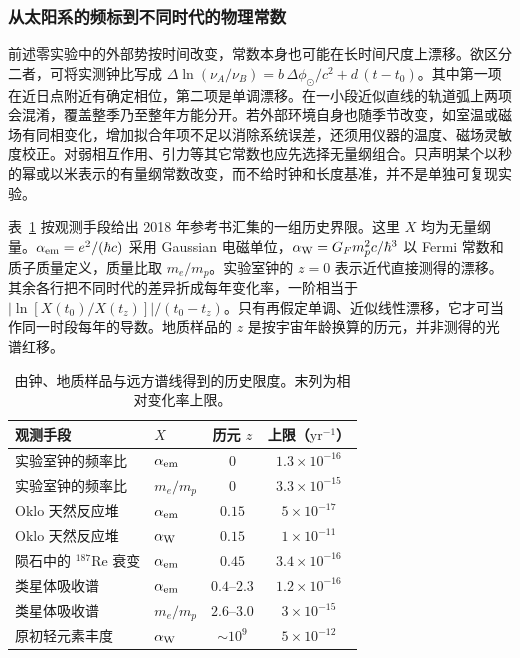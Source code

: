 \subsubsection{从太阳系的频标到不同时代的物理常数}

前述零实验中的外部势按时间改变，常数本身也可能在长时间尺度上漂移。欲区分二者，可将实测钟比写成 $\Delta\ln(\nu_A/\nu_B)=b\,\Delta\phi_\odot/c^2+d\,(t-t_0)$。其中第一项在近日点附近有确定相位，第二项是单调漂移。在一小段近似直线的轨道弧上两项会混淆，覆盖整季乃至整年方能分开。若外部环境自身也随季节改变，如室温或磁场有同相变化，增加拟合年项不足以消除系统误差，还须用仪器的温度、磁场灵敏度校正。对弱相互作用、引力等其它常数也应先选择无量纲组合。只声明某个以秒的幂或以米表示的有量纲常数改变，而不给时钟和长度基准，并不是单独可复现实验。

表~\ref{tab:exp-historical-constants} 按观测手段给出 2018 年参考书汇集的一组历史界限。这里 $X$ 均为无量纲量。$\alpha_{\rm em}=e^2/(\hbar c)$ 采用 Gaussian 电磁单位，$\alpha_{\rm W}=G_Fm_p^2c/\hbar^3$ 以 Fermi 常数和质子质量定义，质量比取 $m_e/m_p$。实验室钟的 $z=0$ 表示近代直接测得的漂移。其余各行把不同时代的差异折成每年变化率，一阶相当于 $|\ln[X(t_0)/X(t_z)]|/(t_0-t_z)$。只有再假定单调、近似线性漂移，它才可当作同一时段每年的导数。地质样品的 $z$ 是按宇宙年龄换算的历元，并非测得的光谱红移。
\begin{table}[htbp]
\centering\small
\caption{由钟、地质样品与远方谱线得到的历史限度。末列为相对变化率上限。}
\label{tab:exp-historical-constants}
\setlength{\tabcolsep}{5pt}
\begin{tabular}{@{}llcc@{}}
\toprule
观测手段 & $X$ & 历元 $z$ & 上限（$\mathrm{yr}^{-1}$）\\
\midrule
实验室钟的频率比 & $\alpha_{\rm em}$ & $0$ & $1.3\times10^{-16}$\\
实验室钟的频率比 & $m_e/m_p$ & $0$ & $3.3\times10^{-15}$\\
Oklo 天然反应堆 & $\alpha_{\rm em}$ & $0.15$ & $5\times10^{-17}$\\
Oklo 天然反应堆 & $\alpha_{\rm W}$ & $0.15$ & $1\times10^{-11}$\\
陨石中的 $^{187}\mathrm{Re}$ 衰变 & $\alpha_{\rm em}$ & $0.45$ & $3.4\times10^{-16}$\\
类星体吸收谱 & $\alpha_{\rm em}$ & $0.4$--$2.3$ & $1.2\times10^{-16}$\\
类星体吸收谱 & $m_e/m_p$ & $2.6$--$3.0$ & $3\times10^{-15}$\\
原初轻元素丰度 & $\alpha_{\rm W}$ & $\sim10^9$ & $5\times10^{-12}$\\
\bottomrule
\end{tabular}
\end{table}

